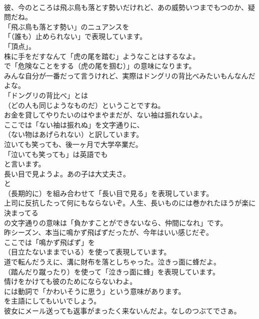 \documentclass[8pt]{extreport}
\begin{document}
\begin{CJK}{UTF8}{min}
\\	彼、今のところは飛ぶ鳥も落とす勢いだけれど、あの威勢いつまでもつのか、疑問だね。 
\\	「飛ぶ鳥も落とす勢い」のニュアンスを
\\	「（誰も）止められない」で表現しています。
\\	「頂点」。	
\\	株に手をだすなんて「虎の尾を踏む」ようなことはするなよ。 
\\	で「危険なことをする（虎の尾を掴む）」の意味になります。	
\\	みんな自分が一番だって言うけれど、実際はドングリの背比べみたいもんなんだよな。 
\\	「ドングリの背比べ」とは
\\	（どの人も同じようなものだ）ということですね。	
\\	お金を貸してやりたいのはやまやまだが、ない袖は振れないよ。 
\\	ここでは「ない袖は振れぬ」を文字通りに、
\\	（ない物はあげられない）と訳しています。	
\\	泣いても笑っても、後一ヶ月で大学卒業だ。 
\\	「泣いても笑っても」は英語でも
\\	と言います。	
\\	長い目で見ようよ。あの子は大丈夫さ。 
\\	と
\\	（長期的に）を組み合わせて「長い目で見る」を表現しています。	
\\	上司に反抗したって何にもならないぞ。人生、長いものには巻かれたほうが楽に決まってる 
\\	の文字通りの意味は「負かすことができないなら、仲間になれ」です。	
\\	昨シーズン、本当に鳴かず飛ばずだったが、今年はいい感じだぞ。 
\\	ここでは「鳴かず飛ばず」を
\\	（目立たないままでいる）を使って表現しています。	
\\	道で転んだうえに、溝に財布を落としちゃった。泣きっ面に蜂だよ。 
\\	（踏んだり蹴ったり）を使って「泣きっ面に蜂」を表現しています。	
\\	情けをかけても彼のためにならないわよ。 
\\	には動詞で「かわいそうに思う」という意味があります。
\\	を主語にしてもいいでしょう。	
\\	彼女にメール送っても返事がまったく来ないんだよ。なしのつぶてでさぁ。 

\end{CJK}
\end{document}
